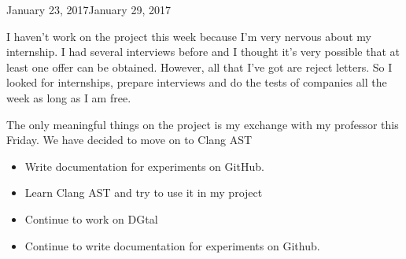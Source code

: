 \begin{fichesuivi}{January 23, 2017}{January 29, 2017}

   \begin{travaileffectue}
        
           I haven't work on the project this week because I'm very nervous about my internship.
I had several interviews before and I thought it's very possible that at least one offer
can be obtained. However, all that I've got are reject letters. So I looked for internships,
prepare interviews and do the tests of companies all the week as long as I am free.

The only meaningful things on the project is my exchange with my professor this Friday.
We have decided to move on to Clang AST
       
   \end{travaileffectue}

   \begin{travailnoneffectue}
        \begin{itemize}
             \item Write documentation for experiments on GitHub.
        \end{itemize}
   \end{travailnoneffectue}

 
   \begin{planification}
        \begin{itemize}
            \item Learn Clang AST and try to use it in my project
            \item Continue to work on DGtal
            \item Continue to write documentation for experiments on Github.
        \end{itemize}
   \end{planification}
\end{fichesuivi}





